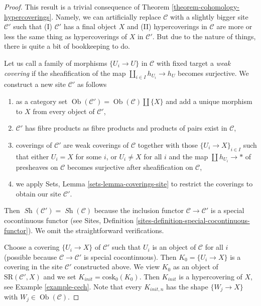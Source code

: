 \documentclass{stacks-project}
\theoremstyle{plain}
\theoremstyle{definition}
\theoremstyle{remark}
\numberwithin{equation}{subsection}
\def\Ob{\mathop{\mathrm{Ob}}\nolimits}
\def\Sh{\mathop{\mathit{Sh}}\nolimits}
\begin{document}
\begin{proof}
This result is a trivial consequence of
Theorem \ref{theorem-cohomology-hypercoverings}.
Namely, we can artificially replace $\mathcal{C}$ with a slightly
bigger site $\mathcal{C}'$ such that
(I) $\mathcal{C}'$ has a final object $X$ and (II)
hypercoverings in $\mathcal{C}$ are more or less the
same thing as hypercoverings of $X$ in $\mathcal{C}'$.
But due to the nature of things, there is quite a bit of
bookkeeping to do.

\medskip\noindent
Let us call a family of morphisms $\{U_i \to U\}$ in $\mathcal{C}$
with fixed target a {\it weak covering} if the sheafification of the
map $\coprod_{i \in I} h_{U_i} \to h_U$ becomes surjective.
We construct a new site $\mathcal{C}'$ as follows
\begin{enumerate}
\item as a category set $\Ob(\mathcal{C}') = \Ob(\mathcal{C}) \amalg \{X\}$
and add a unique morphism to $X$ from every object of $\mathcal{C}'$,
\item $\mathcal{C}'$ has fibre products as fibre products and products
of pairs exist in $\mathcal{C}$,
\item coverings of $\mathcal{C}'$ are weak coverings of $\mathcal{C}$
together with those $\{U_i \to X\}_{i \in I}$ such that either $U_i = X$
for some $i$, or $U_i \not = X$ for all $i$ and the map
$\coprod h_{U_i} \to *$ of presheaves on $\mathcal{C}$ becomes
surjective after sheafification on $\mathcal{C}$,
\item we apply Sets, Lemma \ref{sets-lemma-coverings-site}
to restrict the coverings to obtain our site $\mathcal{C}'$.
\end{enumerate}
Then $\Sh(\mathcal{C}') = \Sh(\mathcal{C})$ because the inclusion
functor $\mathcal{C} \to \mathcal{C}'$ is a special cocontinuous functor
(see Sites, Definition \ref{sites-definition-special-cocontinuous-functor}).
We omit the straightforward verifications.

\medskip\noindent
Choose a covering $\{U_i \to X\}$ of $\mathcal{C}'$ such that $U_i$ is an
object of $\mathcal{C}$ for all $i$ (possible because
$\mathcal{C} \to \mathcal{C}'$ is special cocontinuous).
Then $K_0 = \{U_i \to X\}$ is a covering in the
site $\mathcal{C}'$ constructed above. We view $K_0$ as an object of
$\text{SR}(\mathcal{C}', X)$ and we set $K_{init} = \text{cosk}_0(K_0)$.
Then $K_{init}$ is a hypercovering of $X$, see
Example \ref{example-cech}. Note that every $K_{init, n}$ has the shape
$\{W_j \to X\}$ with $W_j \in \Ob(\mathcal{C})$.


\end{proof}
\end{document}
